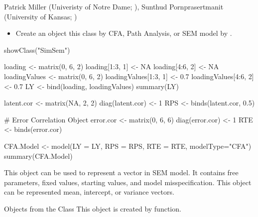 \documentclass[a4paper]{book}
\begin{document}
%
\begin{Author}\relax
Patrick Miller (Univeristy of Notre Dame; ), 
Sunthud Pornprasertmanit (University of Kansas; )
\end{Author}
%
\begin{SeeAlso}\relax
\begin{itemize}

\item Create an object this class by CFA, Path Analysis, or SEM model by .

\end{itemize}

\end{SeeAlso}
%
\begin{Examples}
\begin{ExampleCode}
showClass("SimSem")

loading <- matrix(0, 6, 2)
loading[1:3, 1] <- NA
loading[4:6, 2] <- NA
loadingValues <- matrix(0, 6, 2)
loadingValues[1:3, 1] <- 0.7
loadingValues[4:6, 2] <- 0.7
LY <- bind(loading, loadingValues)
summary(LY)

latent.cor <- matrix(NA, 2, 2)
diag(latent.cor) <- 1
RPS <- binds(latent.cor, 0.5)

# Error Correlation Object
error.cor <- matrix(0, 6, 6)
diag(error.cor) <- 1
RTE <- binds(error.cor)

CFA.Model <- model(LY = LY, RPS = RPS, RTE = RTE, modelType="CFA")
summary(CFA.Model)
\end{ExampleCode}
\end{Examples}
%
\begin{Description}\relax
This object can be used to represent a vector in SEM model. It contains free parameters, fixed values, starting values, and model misspecification. This object can be represented mean, intercept, or variance vectors.
\end{Description}
%
\begin{Section}{Objects from the Class}
This object is created by  function. 
\end{Section}
%
\end{document}
